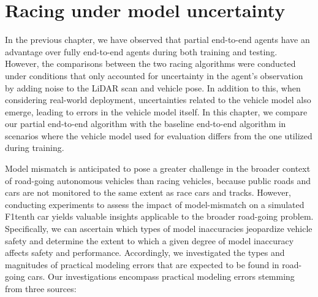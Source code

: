 \chapter{Racing under model uncertainty}\label{chp:racing}


In the previous chapter, we have observed that partial end-to-end agents have an advantage over fully end-to-end agents during both training and testing.
However, the comparisons between the two racing algorithms were conducted under conditions that only accounted for uncertainty in the agent's observation by adding noise to the LiDAR scan and vehicle pose. 
In addition to this, when considering real-world deployment, uncertainties related to the vehicle model also emerge, leading to errors in the vehicle model itself. 
In this chapter, we compare our partial end-to-end algorithm with the baseline end-to-end algorithm in scenarios where the vehicle model used for evaluation differs from the one utilized during training.






Model mismatch is anticipated to pose a greater challenge in the broader context of road-going autonomous vehicles than racing vehicles, because public roads and cars are not monitored to the same extent as race cars and tracks.
However, conducting experiments to assess the impact of model-mismatch on a simulated F1tenth car yields valuable insights applicable to the broader road-going problem. 
Specifically, we can ascertain which types of model inaccuracies jeopardize vehicle safety and determine the extent to which a given degree of model inaccuracy affects safety and performance. 
Accordingly, we investigated the types and magnitudes of practical modeling errors that are expected to be found in road-going cars. 
Our investigations encompass practical modeling errors stemming from three sources:

